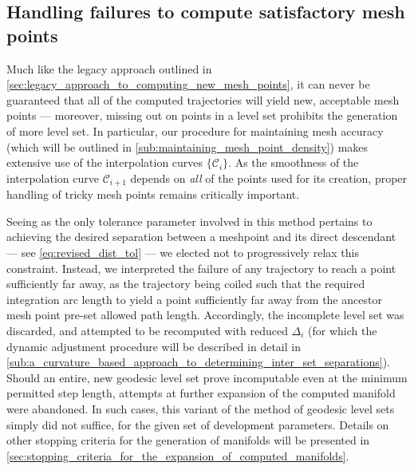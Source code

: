 \subsection{Handling failures to compute satisfactory mesh points}
\label{sub:handling_failures_to_compute_satisfactory_mesh_points_revised}

Much like the legacy approach outlined in
\cref{sec:legacy_approach_to_computing_new_mesh_points}, it can never be
guaranteed that all of the computed trajectories will yield new, acceptable
mesh points --- moreover, missing out on points in a level set prohibits
the generation of more level set. In particular, our procedure for maintaining
mesh accuracy (which will be outlined in
\cref{sub:maintaining_mesh_point_density}) makes extensive use of the
interpolation curves $\{\mathcal{C}_{i}\}$. As the smoothness of the
interpolation curve $\mathcal{C}_{i+1}$ depends on \emph{all} of the points used
for its creation, proper handling of tricky mesh points remains critically
important.

Seeing as the only tolerance parameter involved in this method pertains to
achieving the desired separation between a meshpoint and its direct descendant
--- see \cref{eq:revised_dist_tol} --- we elected not to progressively relax
this  constraint. Instead, we interpreted the failure of any trajectory to reach
a point sufficiently far away, as the trajectory being coiled such that the
required integration arc length to yield a point sufficiently far away from
the ancestor mesh point pre-set allowed path length. Accordingly, the incomplete
level set was discarded, and attempted to be recomputed with reduced
$\Delta_{i}$ (for which the dynamic adjustment procedure will be described
in detail in
\cref{sub:a_curvature_based_approach_to_determining_inter_set_separations}).
Should an entire, new geodesic level set prove incomputable even at the
minimum permitted step length, attempts at further expansion of the computed
manifold were abandoned. In such cases, this variant of the method of geodesic
level sets simply did not suffice, for the given set of development parameters.
Details on other stopping criteria for the generation of manifolds will be
presented in
\cref{sec:stopping_criteria_for_the_expansion_of_computed_manifolds}.

